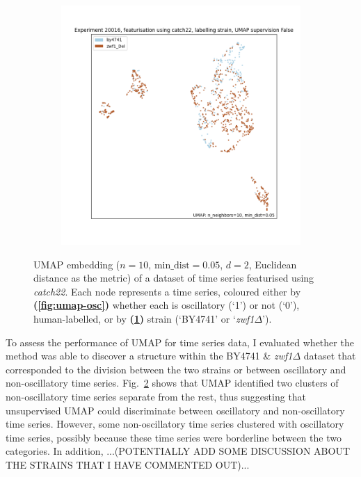 \begin{figure}
  \begin{subfigure}[t]{0.7\textwidth}
  \centering
    \includegraphics[width=\linewidth]{Figure_13}
    \caption{
    }
    \label{fig:umap-strain}
  \end{subfigure}

  \caption[
      UMAP embedding of a dataset of time series featurised using \textit{catch22}.
    ]{
      UMAP embedding ($n=10$, $\mathrm{min\_dist} = 0.05$, $d=2$, Euclidean distance as the metric) of a dataset of time series featurised using \textit{catch22}.
      Each node represents a time series, coloured either by
      \textbf{(\ref{fig:umap-osc})}
      whether each is oscillatory (`1') or not (`0'), human-labelled, or by
      \textbf{(\ref{fig:umap-strain})}
      strain (`BY4741' or `\textit{zwf1$\Delta$}').
    }
  \label{fig:umap}
\end{figure}

To assess the performance of UMAP for time series data, I evaluated whether the method was able to discover a structure within the BY4741 \& \textit{zwf1$\Delta$} dataset that corresponded to the division between the two strains or between oscillatory and non-oscillatory time series.
Fig.\ \ref{fig:umap} shows that UMAP identified two clusters of non-oscillatory time series separate from the rest, thus suggesting that unsupervised UMAP could discriminate between oscillatory and non-oscillatory time series.
However, some non-oscillatory time series clustered with oscillatory time series, possibly because these time series were borderline between the two categories.
In addition, ...(POTENTIALLY ADD SOME DISCUSSION ABOUT THE STRAINS THAT I HAVE COMMENTED OUT)...

